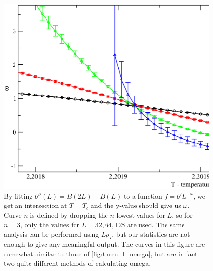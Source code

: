 \begin{figure}[!htpb]
  \centering
  \label{fig:omega_two_l}
  \includegraphics[width=\textwidth]{./plots/3DXY/vsT/omega.eps}
  \caption{By fitting $b''(L) = B(2L) - B(L)$ to a function $f = b'L^{-\omega}$, we get an intersection at $T=T_c$ and the y-value should give us $\omega$. Curve $n$ is defined by dropping the $n$ lowest values for $L$, so for $n = 3$, only the values for $L= 32,64,128$ are used. The same analysis can be performed using $L\rho_s$, but our statistics are not enough to give any meaningful output. The curves in this figure are somewhat similar to those of \ref{fig:three_l_omega}, but are in fact two quite different methods of calculating omega. }
\end{figure}

